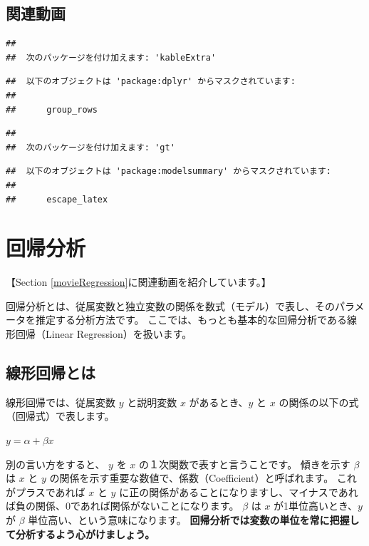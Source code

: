 \documentclass[
]{book}
\begin{document}
\hypertarget{movieTtest}{%
\section{関連動画}\label{movieTtest}}

\begin{verbatim}
## 
##  次のパッケージを付け加えます: 'kableExtra'
\end{verbatim}

\begin{verbatim}
##  以下のオブジェクトは 'package:dplyr' からマスクされています: 
## 
##      group_rows
\end{verbatim}

\begin{verbatim}
## 
##  次のパッケージを付け加えます: 'gt'
\end{verbatim}

\begin{verbatim}
##  以下のオブジェクトは 'package:modelsummary' からマスクされています: 
## 
##      escape_latex
\end{verbatim}

\hypertarget{Regression}{%
\chapter{回帰分析}\label{Regression}}

【Section \ref{movieRegression}に関連動画を紹介しています。】

回帰分析とは、従属変数と独立変数の関係を数式（モデル）で表し、そのパラメータを推定する分析方法です。
ここでは、もっとも基本的な回帰分析である線形回帰（Linear Regression）を扱います。

\hypertarget{ux7ddaux5f62ux56deux5e30ux3068ux306f}{%
\section{線形回帰とは}\label{ux7ddaux5f62ux56deux5e30ux3068ux306f}}

線形回帰では、従属変数 \(y\) と説明変数 \(x\) があるとき、\(y\) と \(x\) の関係の以下の式（回帰式）で表します。

\(y = \alpha + \beta x\)

別の言い方をすると、 \(y\) を \(x\) の１次関数で表すと言うことです。
傾きを示す \(\beta\) は \(x\) と \(y\) の関係を示す重要な数値で、係数（Coefficient）と呼ばれます。
これがプラスであれば \(x\) と \(y\) に正の関係があることになりますし、マイナスであれば負の関係、0であれば関係がないことになります。
\(\beta\) は \(x\) が1単位高いとき、\(y\) が \(\beta\) 単位高い、という意味になります。
\textbf{回帰分析では変数の単位を常に把握して分析するよう心がけましょう。}
\end{document}
